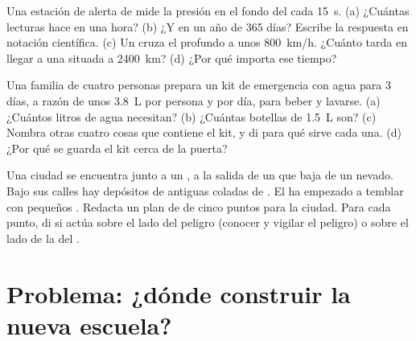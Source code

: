 \begin{exercise}[$\star\star$]\label{exo:g9:natural-risks:10}
Una estación de alerta de  mide la presión en el fondo del 
cada \qty{15}{s}. (a) ¿Cuántas lecturas hace en una hora? (b) ¿Y en un año
de 365 días? Escribe la respuesta en notación científica. (c) Un 
cruza el  profundo a unos \qty{800}{km/h}. ¿Cuánto tarda en llegar a
una  situada a \qty{2400}{km}? (d) ¿Por qué importa ese tiempo?
\end{exercise}

\begin{exercise}[$\star\star\star$]\label{exo:g9:natural-risks:11}
Una familia de cuatro personas prepara un kit de emergencia con agua para
3 días, a razón de unos \qty{3.8}{L} por persona y por día, para beber y
lavarse. (a) ¿Cuántos litros de agua necesitan? (b) ¿Cuántas botellas de
\qty{1.5}{L} son? (c) Nombra otras cuatro cosas que contiene el kit, y di
para qué sirve cada una. (d) ¿Por qué se guarda el kit cerca de la puerta?
\end{exercise}

\begin{exercise}[$\star\star\star$]\label{exo:g9:natural-risks:12}
Una ciudad se encuentra junto a un , a la salida de un  que baja
de un  nevado. Bajo sus calles hay depósitos de antiguas coladas de
. El  ha empezado a temblar con pequeños . Redacta un
plan de  de cinco puntos para la ciudad. Para cada punto, di si
actúa sobre el lado del peligro (conocer y vigilar el peligro) o sobre el
lado de la  del .
\end{exercise}

\section{Problema: ¿dónde construir la nueva escuela?}

